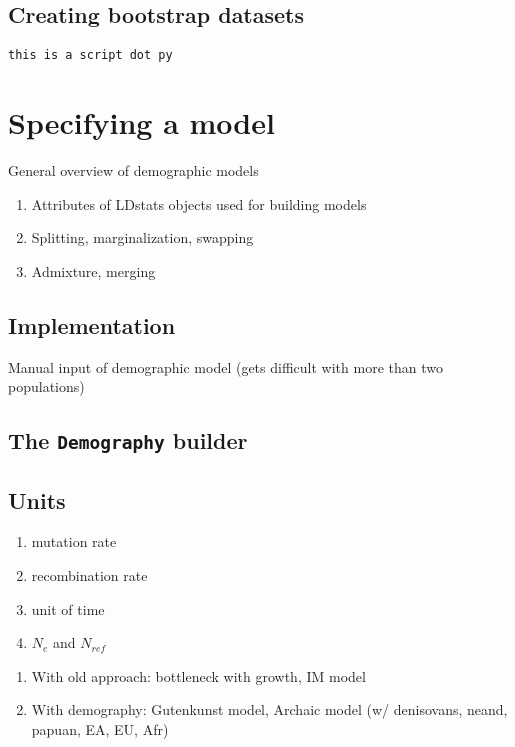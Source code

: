 \documentclass[11pt]{article}
\begin{document}
\subsection{Creating bootstrap datasets}

\clearpage
\begin{lstlisting}[caption={\textbf{Parsing:} Example of parsing data generated by msprime}, float, label={lst:bottleneck}]
this is a script dot py
\end{lstlisting}

\clearpage

\section{Specifying a model}

General overview of demographic models

\begin{enumerate}
\item Attributes of LDstats objects used for building models
\item Splitting, marginalization, swapping
\item Admixture, merging
\end{enumerate}

\subsection{Implementation}

Manual input of demographic model (gets difficult with more than two populations)

\subsection{The \texttt{Demography} builder}

\subsection{Units}
\begin{enumerate}
\item mutation rate
\item recombination rate
\item unit of time
\item $N_e$ and $N_{ref}$
\end{enumerate}

\clearpage
\begin{enumerate}
\item With old approach: bottleneck with growth, IM model
\item With demography: Gutenkunst model, Archaic model (w/ denisovans, neand, papuan, EA, EU, Afr)
\end{enumerate}
\end{document}
